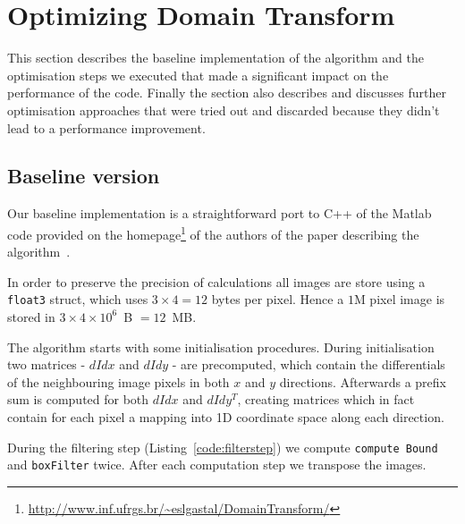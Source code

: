 \section{Optimizing Domain Transform}

This section describes the baseline implementation of the algorithm and the optimisation steps we executed that made a significant impact on the performance of the code. Finally the section also describes and discusses further optimisation approaches that were tried out and discarded because they didn't lead to a performance improvement.

\subsection{Baseline version}

Our baseline implementation is a straightforward port to C++ of the Matlab code provided on the homepage\footnote{\url{http://www.inf.ufrgs.br/~eslgastal/DomainTransform/}} of the authors of the paper describing the algorithm~\cite{GastalOliveira2011DomainTransform}.


In order to preserve the precision of calculations all images are store using a \lstinline{float3} struct, which uses $3\times 4 = 12$ bytes per pixel. Hence a $1$M pixel image is stored in $3\times 4\times 10^6$\ B $=12$\ MB.

The algorithm starts with some initialisation procedures. During initialisation two matrices - $dIdx$ and $dIdy$ - are precomputed, which contain the differentials of the neighbouring image pixels in both $x$ and $y$ directions. Afterwards a prefix sum is computed for both $dIdx$ and $dIdy^T$, creating matrices which in fact contain for each pixel a mapping into 1D coordinate space along each direction.

During the filtering step (Listing~\ref{code:filterstep}) we compute \texttt{comp\-ute\ Bound} and \texttt{boxFilter} twice. After each computation step we transpose the images.

